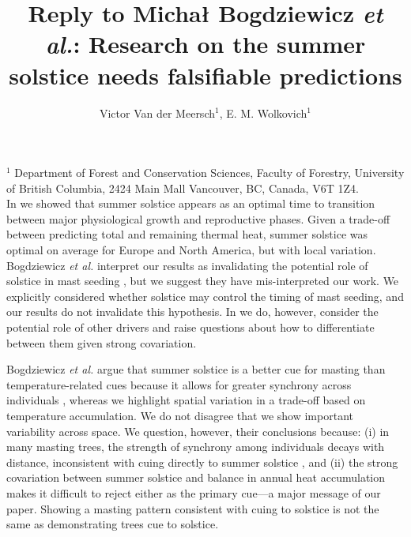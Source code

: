\documentclass[11pt,letter]{article}
\begin{document}
\title{Reply to Michał Bogdziewicz \emph{et al.}: Research on the summer solstice needs falsifiable predictions} %

\author{Victor Van der Meersch$^{1}$, E. M. Wolkovich$^{1}$}
\date{}
\maketitle 

$^1$ Department of Forest and Conservation Sciences, Faculty of Forestry, University of British Columbia, 2424 Main Mall
Vancouver, BC, Canada, V6T 1Z4. \\

In \citep{VanderMeersch2025} we showed that summer solstice appears as an optimal time to transition between major physiological growth and reproductive phases. Given a trade-off between predicting total and remaining thermal heat, summer solstice was optimal on average for Europe and North America, but with local variation. Bogdziewicz \emph{et al.} interpret our results as invalidating the potential role of solstice in mast seeding \citep{Bogdziewiczresponse}, but we suggest they have mis-interpreted our work. We explicitly considered whether solstice may control the timing of mast seeding, and our results do not invalidate this hypothesis. In \citep{VanderMeersch2025} we do, however, consider the potential role of other drivers and raise questions about how to differentiate between them given strong covariation. 

Bogdziewicz \emph{et al.} argue that summer solstice is a better cue for masting than temperature-related cues because it allows for greater synchrony across individuals \citep{Bogdziewiczresponse}, whereas we highlight spatial variation in a trade-off based on temperature accumulation. We do not disagree that we show important variability across space. We question, however, their conclusions because: (i) in many masting trees, the strength of synchrony among individuals decays with distance, inconsistent with cuing directly to summer solstice \citep{Liebhold2004}, and (ii) the strong covariation between summer solstice and balance in annual heat accumulation makes it difficult to reject either as the primary cue---a major message of our paper. Showing a masting pattern consistent with cuing to solstice is not the same as demonstrating trees cue to solstice.
\end{document}
